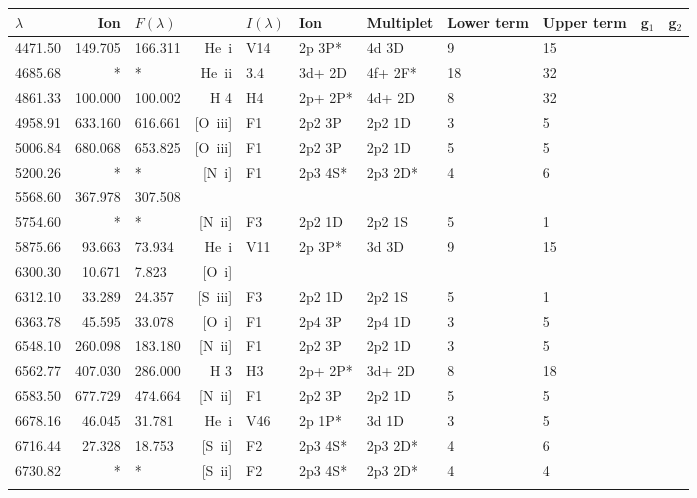 \begin{longtable}{lrlrlllllll}
 \hline
 $ \lambda $ & Ion & $F \left( \lambda \right) $ && $I \left( \lambda \right) $ & Ion & Multiplet & Lower term & Upper term & g$_1$ & g$_2$ \\
 \hline
 4471.50 & 149.705 & 166.311 &  He~{\sc i}      &  V14       &  2p 3P*    &  4d 3D     &          9 &       15    \\
 4685.68 & *       & *       &  He~{\sc ii}     &  3.4       &  3d+ 2D    &  4f+ 2F*   &         18 &       32    \\
 4861.33 & 100.000 & 100.002 &  H 4       &  H4        &  2p+ 2P*   &  4d+ 2D    &          8 &       32          \\
 4958.91 & 633.160 & 616.661 &  [O~{\sc iii}]   &  F1        &  2p2 3P    &  2p2 1D    &          3 &        5    \\
 5006.84 & 680.068 & 653.825 &  [O~{\sc iii}]   &  F1        &  2p2 3P    &  2p2 1D    &          5 &        5    \\
 5200.26 & *       & *       &  [N~{\sc i}]     &  F1        &  2p3 4S*   &  2p3 2D*   &          4 &        6    \\
 5568.60 & 367.978 & 307.508                                                                                      \\
 5754.60 & *       & *       &  [N~{\sc ii}]    &  F3        &  2p2 1D    &  2p2 1S    &          5 &        1    \\
 5875.66 &  93.663 &  73.934 &  He~{\sc i}      &  V11       &  2p 3P*    &  3d 3D     &          9 &       15    \\
 6300.30 &  10.671 &   7.823 & [O~{\sc i}]                                                                        \\
 6312.10 &  33.289 &  24.357 &  [S~{\sc iii}]   &  F3        &  2p2 1D    &  2p2 1S    &          5 &        1    \\
 6363.78 &  45.595 &  33.078 &  [O~{\sc i}]     &  F1        &  2p4 3P    &  2p4 1D    &          3 &        5    \\
 6548.10 & 260.098 & 183.180 &  [N~{\sc ii}]    &  F1        &  2p2 3P    &  2p2 1D    &          3 &        5    \\
 6562.77 & 407.030 & 286.000 &  H 3       &  H3        &  2p+ 2P*   &  3d+ 2D    &          8 &       18          \\
 6583.50 & 677.729 & 474.664 &  [N~{\sc ii}]    &  F1        &  2p2 3P    &  2p2 1D    &          5 &        5    \\
 6678.16 &  46.045 &  31.781 &  He~{\sc i}      &  V46       &  2p 1P*    &  3d 1D     &          3 &        5    \\
 6716.44 &  27.328 &  18.753 &  [S~{\sc ii}]    &  F2        &  2p3 4S*   &  2p3 2D*   &          4 &        6    \\
 6730.82 & *       & *       &  [S~{\sc ii}]    &  F2        &  2p3 4S*   &  2p3 2D*   &          4 &        4    \\
 \hline
 \label{tab:/home/hmonteiro/Dropbox/work/devel/Neat_2d/neat-1.7/mz1/temp.out_linelist}
 \end{longtable}
